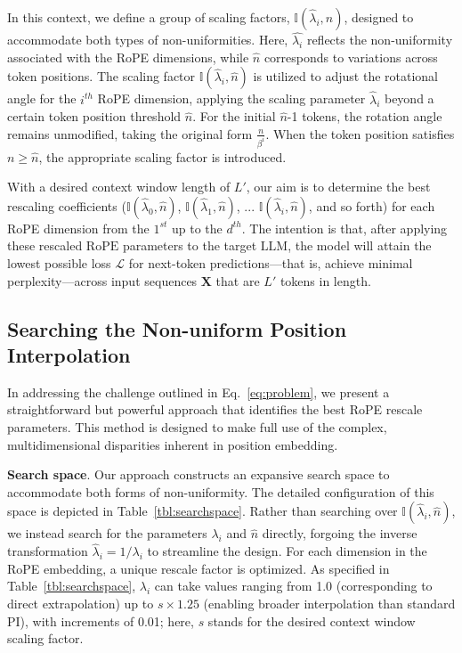 In this context, we define a group of scaling factors, $\mathbb{I}(\hat{\lambda}_{i},\hat{n})$, designed to accommodate both types of non-uniformities. Here, $\hat{\lambda_i}$ reflects the non-uniformity associated with the RoPE dimensions, while $\hat{n}$ corresponds to variations across token positions. The scaling factor $\mathbb{I}(\hat{\lambda}_{i},\hat{n})$ is utilized to adjust the rotational angle for the $i^{th}$ RoPE dimension, applying the scaling parameter $\hat\lambda_{i}$ beyond a certain token position threshold $\hat{n}$. For the initial $\hat{n}$-1 tokens, the rotation angle remains unmodified, taking the original form $\frac{n}{\beta^i}$. When the token position satisfies $n\ge\hat{n}$, the appropriate scaling factor is introduced.

With a desired context window length of $L'$, our aim is to determine the best rescaling coefficients ($\mathbb{I}(\hat{\lambda}_{0},\hat{n})$, $\mathbb{I}(\hat{\lambda}_{1},\hat{n})$, ... $\mathbb{I}(\hat{\lambda}_{i},\hat{n})$, and so forth) for each RoPE dimension from the $1^{st}$ up to the $d^{th}$. The intention is that, after applying these rescaled $\text{RoPE}$ parameters to the target $\text{LLM}$, the model will attain the lowest possible loss $\mathcal{L}$ for next-token predictions—that is, achieve minimal perplexity—across input sequences $\mathbf{X}$ that are $L'$ tokens in length.

\subsection{Searching the Non-uniform Position Interpolation}

In addressing the challenge outlined in Eq.~\ref{eq:problem}, we present a straightforward but powerful approach that identifies the best RoPE rescale parameters. This method is designed to make full use of the complex, multidimensional disparities inherent in position embedding.

\textbf{Search space}. Our approach constructs an expansive search space to accommodate both forms of non-uniformity. The detailed configuration of this space is depicted in Table~\ref{tbl:searchspace}. Rather than searching over $\mathbb{I}(\hat{\lambda}_{i},\hat{n})$, we instead search for the parameters $\lambda_i$ and $\hat{n}$ directly, forgoing the inverse transformation $\hat{\lambda}_{i} = 1/\lambda_i$ to streamline the design. For each dimension in the RoPE embedding, a unique rescale factor is optimized. As specified in Table~\ref{tbl:searchspace}, $\lambda_i$ can take values ranging from 1.0 (corresponding to direct extrapolation) up to $s\times1.25$ (enabling broader interpolation than standard PI), with increments of 0.01; here, $s$ stands for the desired context window scaling factor.

